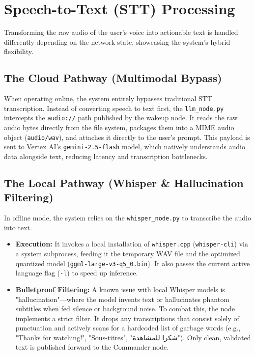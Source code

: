 \section{Speech-to-Text (STT) Processing}
Transforming the raw audio of the user's voice into actionable text is handled differently depending on the network state, showcasing the system's hybrid flexibility.

\subsection{The Cloud Pathway (Multimodal Bypass)}
When operating online, the system entirely bypasses traditional STT transcription. Instead of converting speech to text first, the \texttt{llm\_node.py} intercepts the \texttt{audio://} path published by the wakeup node. It reads the raw audio bytes directly from the file system, packages them into a MIME audio object (\texttt{audio/wav}), and attaches it directly to the user's prompt. This payload is sent to Vertex AI's \texttt{gemini-2.5-flash} model, which natively understands audio data alongside text, reducing latency and transcription bottlenecks.

\subsection{The Local Pathway (Whisper \& Hallucination Filtering)}
In offline mode, the system relies on the \texttt{whisper\_node.py} to transcribe the audio into text.
\begin{itemize}
    \item \textbf{Execution:} It invokes a local installation of \texttt{whisper.cpp} (\texttt{whisper-cli}) via a system subprocess, feeding it the temporary WAV file and the optimized quantized model (\texttt{ggml-large-v3-q5\_0.bin}). It also passes the current active language flag (\texttt{-l}) to speed up inference.
    \item \textbf{Bulletproof Filtering:} A known issue with local Whisper models is "hallucination"—where the model invents text or hallucinates phantom subtitles when fed silence or background noise. To combat this, the node implements a strict filter. It drops any transcriptions that consist solely of punctuation and actively scans for a hardcoded list of garbage words (e.g., "Thanks for watching!", "Sous-titres", "شكرا للمشاهدة"). Only clean, validated text is published forward to the Commander node.
\end{itemize}

